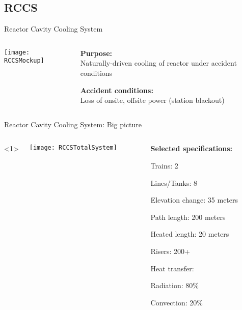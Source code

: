     \subsection{RCCS}
    \begin{frame}{Reactor Cavity Cooling System}
        \begin{columns}
            \begin{column}[T]{0.45\textwidth}
                \texttt{[image: RCCSMockup]}
            \end{column}
            \begin{column}[T]{0.45\textwidth}
                \textbf{Purpose:}\hfill\\
                Naturally-driven cooling of reactor under accident conditions
                
                \vspace*{2em}
                \textbf{Accident conditions:}\hfill\\
                Loss of onsite, offsite power (station blackout)
            \end{column}
        \end{columns}
    \end{frame}
    

    \begin{frame}{Reactor Cavity Cooling System: Big picture}
    \begin{columns}<1>
        \begin{column}[T]{0.45\textwidth}
            \texttt{[image: RCCSTotalSystem]}
        \end{column}
         \begin{column}[T]{0.45\textwidth}
            \textbf{Selected specifications:}\\[0.2em]
            \begin{Itemize}
                \item{Trains: 2}
                \item{Lines/Tanks: 8}
                \item{Elevation change: 35 meters}
                \item{Path length: 200 meters}
                \item{Heated length: 20 meters}
                \item{Risers: 200+}
                \item{Heat transfer:}
                \begin{Itemize}
                    \item{Radiation: 80\%}
                    \item{Convection: 20\%}
                \end{Itemize}
            \end{Itemize}
        \end{column}
    \end{columns}
\end{frame}


